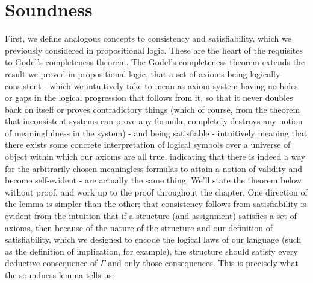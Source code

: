 \documentclass{article}
\begin{document}
\section{Soundness}
First, we define analogous concepts to consistency and satisfiability, which we previously considered in propositional logic. These are the heart of the requisites to Godel's completeness theorem.
The Godel's completeness theorem extends the result we proved in propositional logic, that a set of axioms being logically consistent - which we intuitively take to mean as axiom system having no holes or gaps in the logical progression that follows from it, so that it never doubles back on itself or proves contradictory things (which of course, from the theorem that inconsistent systems can prove any formula, completely destroys any notion of meaningfulness in the system) - and being satisfiable - intuitively meaning that there exists some concrete interpretation of logical symbols over a universe of object within which our axioms are all true, indicating that there is indeed a way for the arbitrarily chosen meaningless formulas to attain a notion of validity and become self-evident - are actually the same thing. We'll state the theorem below without proof, and work up to the proof throughout the chapter.
One direction of the lemma is simpler than the other; that consistency follows from satisfiability is evident from the intuition that if a structure (and assignment) satisfies a set of axioms, then because of the nature of the structure and our definition of satisfiability, which we designed to encode the logical laws of our language (such as the definition of implication, for example), the structure should satisfy every deductive consequence of $ \Gamma $ and only those consequences. This is precisely what the soundness lemma tells us:
\end{document}
